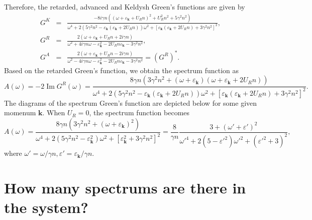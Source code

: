 \documentclass[aps,onecolumn,superscriptaddress,notitlepage,longbibliography]{revtex4-1}
\newcommand{\tmmathbf}[1]{\ensuremath{\boldsymbol{#1}}}
\newcommand{\tmop}[1]{\ensuremath{\operatorname{#1}}}
\begin{document}
Therefore, the retarded, advanced and Keldysh Green's functions are given by
\begin{eqnarray}
  G^K & = & \frac{- 8 i \gamma n ((\omega + \varepsilon_{\tmmathbf{k}} + U_R
  n)^2 + U_R^2 n^2 + 5 \gamma^2 n^2)}{\omega^4 + 2 (5 \gamma^2 n^2 -
  \varepsilon_{\tmmathbf{k}} (\varepsilon_{\tmmathbf{k}} + 2 U_R n)) \omega^2
  + [\varepsilon_{\tmmathbf{k}} (\varepsilon_{\tmmathbf{k}} + 2 U_R n) + 3
  \gamma^2 n^2]^2}, \\
  G^R & = & \frac{2 (\omega + \varepsilon_{\tmmathbf{k}} + U_R n + 2 i \gamma
  n)}{\omega^2 + 4 i \gamma n \omega - \varepsilon_{\tmmathbf{k}}^2 - 2 U_R n
  \varepsilon_{\tmmathbf{k}} - 3 \gamma^2 n^2}, \\
  G^A & = & \frac{2 (\omega + \varepsilon_{\tmmathbf{k}} + U_R n - 2 i \gamma
  n)}{\omega^2 - 4 i \gamma n \omega - \varepsilon_{\tmmathbf{k}}^2 - 2 U_R n
  \varepsilon_{\tmmathbf{k}} - 3 \gamma^2 n^2} = (G^R)^{\ast} . 
\end{eqnarray}
Based on the retarded Green's function, we obtain the spectrum function as
\begin{equation}
  A (\omega) = - 2 \tmop{Im} G^R (\omega) = \frac{8 \gamma n (3 \gamma^2 n^2 +
  (\omega + \varepsilon_{\tmmathbf{k}}) (\omega + \varepsilon_{\tmmathbf{k}} +
  2 U_R n))}{\omega^4 + 2 (5 \gamma^2 n^2 - \varepsilon_{\tmmathbf{k}}
  (\varepsilon_{\tmmathbf{k}} + 2 U_R n)) \omega^2 +
  [\varepsilon_{\tmmathbf{k}} (\varepsilon_{\tmmathbf{k}} + 2 U_R n) + 3
  \gamma^2 n^2]^2} .
\end{equation}
The diagrams of the spectrum Green's function are depicted below for some
given momenum $\tmmathbf{k}$. When $U_R = 0$, the spectrum function becomes
\begin{equation}
  A (\omega) = \frac{8 \gamma n (3 \gamma^2 n^2 + (\omega +
  \varepsilon_{\tmmathbf{k}})^2)}{\omega^4 + 2 (5 \gamma^2 n^2 -
  \varepsilon_{\tmmathbf{k}}^2) \omega^2 + [\varepsilon_{\tmmathbf{k}}^2 + 3
  \gamma^2 n^2]^2} = \frac{8}{\gamma n} \frac{3 + (\omega' +
  \varepsilon')^2}{{\omega'}^4 + 2 \left( {5 - \varepsilon'}^2 \right)
  {\omega'}^2 + \left( {\varepsilon'}^2 + 3 \right)^2},
\end{equation}
where $\omega' = \omega / \gamma n, \varepsilon' = \varepsilon_{\tmmathbf{k}}
/ \gamma n$.

\section{How many spectrums are there in the system?}
\end{document}
